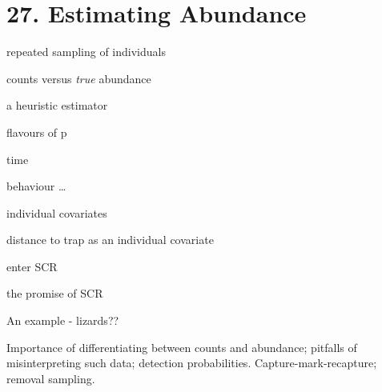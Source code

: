 \documentclass{book}
\begin{document}
\chapter*{27. Estimating Abundance\\
          }
\begin{itemize}
\item{repeated sampling of individuals}
\item{counts versus \emph{true} abundance}
\item{a heuristic estimator}
\item{flavours of p
  \item{time}
  \item{behaviour}
  \ldots
  \item{individual covariates}
}
\item{distance to trap as an individual covariate}
\item{enter SCR}
\item{the promise of SCR}
\item{An example - lizards??}



\end{itemize}
Importance of differentiating between counts and abundance; pitfalls of misinterpreting such data; detection probabilities. Capture-mark-recapture; removal sampling.
\end{document}
